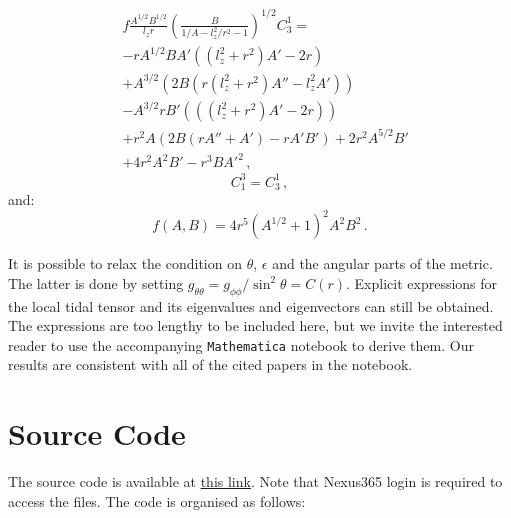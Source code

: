 \documentclass[11pt, twocolumn]{article}
\begin{document}
\begin{equation}
    \begin{split}
        &f \frac{A^{1/2}B^{1/2}}{l_{z} r} \left( \frac{B}{1/A - l_{z}^{2}/r^{2} - 1} \right)^{1/2} C^{1}_{3} = \\
        &- r A^{1/2} B A' \left( \left( l_{z}^{2} + r^{2} \right) A' - 2 r \right) \\
        &+ A^{3/2} \left( 2 B \left( r \left( l_{z}^{2} + r^{2} \right) A'' - l_{z}^{2} A' \right) \right) \\
        &- A^{3/2} r B' \left( \left( \left( l_{z}^{2} + r^{2} \right) A' - 2 r \right) \right)  \\
        &+ r^{2} A \left( 2 B \left( r A'' + A' \right) - r A' B' \right) + 2 r^{2} A^{5/2} B' \\
        &+ 4 r^{2} A^{2} B' - r^3 B A'^{2} \, ,
    \end{split}
\end{equation}
\begin{equation}
    C^{3}_{1} = C^{1}_{3} \, ,
\end{equation}
and:
\begin{equation}
    f(A, B) = 4 r^5 \left( A^{1/2} + 1 \right)^{2} A^{2} B^{2} \, .
\end{equation}

It is possible to relax the condition on $\theta$, $\epsilon$ and the angular parts of the metric. The latter is done by setting $g_{\theta\theta} = g_{\phi\phi}/\sin^{2}{\theta} = C(r)$. Explicit expressions for the local tidal tensor and its eigenvalues and eigenvectors can still be obtained. The expressions are too lengthy to be included here, but we invite the interested reader to use the accompanying \texttt{Mathematica} notebook to derive them. Our results are consistent with all of the cited papers in the notebook.


\section{Source Code} \label{app:code}


The source code is available at \href{https://unioxfordnexus-my.sharepoint.com/:f:/g/personal/exet5758_ox_ac_uk/EqVCppripCpAjYcxPht6mXABl-FsBaYHQBCxma3uGKZzXg?e=IZO2rz}{this link}. Note that Nexus365 login is required to access the files. The code is organised as follows:
\end{document}
